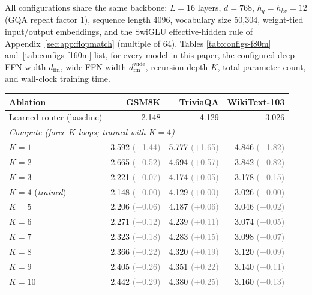 \documentclass[11pt]{article}
\newcommand{\ssub}[1]{{\scriptsize\textcolor{gray}{(#1)}}}
\begin{document}
All configurations share the same backbone: $L = 16$ layers,
$d = 768$, $h_q = h_{kv} = 12$ (GQA repeat factor 1), sequence
length 4096, vocabulary size 50{,}304, weight-tied input/output
embeddings, and the SwiGLU effective-hidden rule of
Appendix~\ref{sec:app:flopmatch} (multiple of 64). Tables
\ref{tab:configs-f80m} and~\ref{tab:configs-f160m} list, for
every model in this paper, the configured deep FFN width
$d_{\text{ffn}}$, wide FFN width
$d_{\text{ffn}}^{\text{wide}}$, recursion depth $K$, total
parameter count, and wall-clock training time. 

\begin{table}[t]
\centering
\small
\setlength{\tabcolsep}{6pt}
\begin{tabular}{l r r r}
\toprule
\textbf{Ablation} & \textbf{GSM8K} & \textbf{TriviaQA} & \textbf{WikiText-103} \\
\midrule
Learned router (baseline)                  & 2.148 & 4.129 & 3.026 \\
\midrule
\multicolumn{4}{l}{\emph{Compute (force $K$ loops; trained with $K{=}4$)}} \\
\quad $K{=}1$                              & 3.592 \ssub{+1.44}   & 5.777 \ssub{+1.65}   & 4.846 \ssub{+1.82}   \\
\quad $K{=}2$                              & 2.665 \ssub{+0.52}   & 4.694 \ssub{+0.57}   & 3.842 \ssub{+0.82}   \\
\quad $K{=}3$                              & 2.221 \ssub{+0.07}   & 4.174 \ssub{+0.05}   & 3.178 \ssub{+0.15}   \\
\quad $K{=}4$ (\emph{trained})             & 2.148 \ssub{+0.00}   & 4.129 \ssub{+0.00}   & 3.026 \ssub{+0.00}   \\
\quad $K{=}5$                              & 2.206 \ssub{+0.06}   & 4.187 \ssub{+0.06}   & 3.046 \ssub{+0.02}   \\
\quad $K{=}6$                              & 2.271 \ssub{+0.12}   & 4.239 \ssub{+0.11}   & 3.074 \ssub{+0.05}   \\
\quad $K{=}7$                              & 2.323 \ssub{+0.18}   & 4.283 \ssub{+0.15}   & 3.098 \ssub{+0.07}   \\
\quad $K{=}8$                              & 2.366 \ssub{+0.22}   & 4.320 \ssub{+0.19}   & 3.120 \ssub{+0.09}   \\
\quad $K{=}9$                              & 2.405 \ssub{+0.26}   & 4.351 \ssub{+0.22}   & 3.140 \ssub{+0.11}   \\
\quad $K{=}10$                             & 2.442 \ssub{+0.29}   & 4.380 \ssub{+0.25}   & 3.160 \ssub{+0.13}   \\

\end{tabular}
\end{table}
\end{document}
